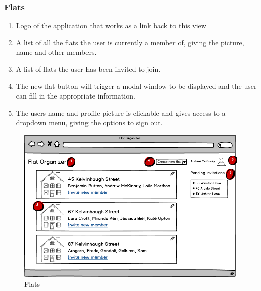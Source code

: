 \documentclass{sig-alt-release2}
\begin{document}
\subsubsection{Flats}

\begin{enumerate}
\item Logo of the application that works as a link back to this view
\item A list of all the flats the user is currently a member of, giving the picture, name and other members. 
\item A list of flats the user has been invited to join. 
\item The new flat button will trigger a modal window to be displayed and the user can fill in the appropriate information.
\item The users name and profile picture is clickable and gives access to a dropdown menu, giving the options to sign out.
\end{enumerate}

\begin{figure}[!ht]
\centering
\includegraphics[scale=0.25]{flats}
\caption{Flats}
\label{fig:flats}
\end{figure}
\end{document}
